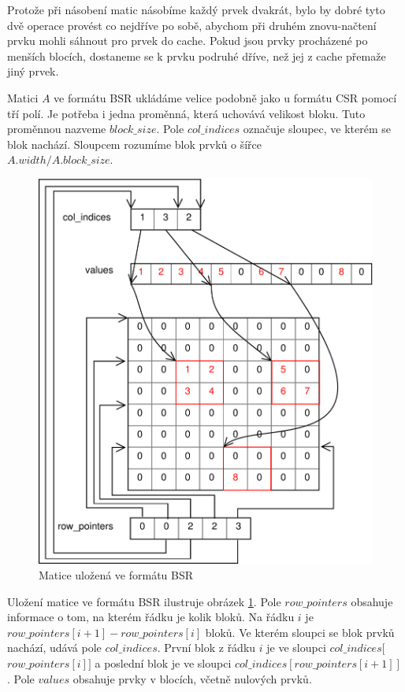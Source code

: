 Protože při násobení matic násobíme každý prvek dvakrát, bylo by dobré tyto dvě operace provést co nejdříve po sobě, abychom při druhém znovu-načtení prvku mohli sáhnout pro prvek do cache. Pokud jsou prvky procházené po menších blocích, dostaneme se k prvku podruhé dříve, než jej z cache přemaže jiný prvek.

Matici $A$ ve formátu BSR ukládáme velice podobně jako u formátu CSR pomocí tří polí. Je potřeba i jedna proměnná, která uchovává velikost bloku. Tuto proměnnou nazveme $block\_size$. Pole $col\_indices$ označuje sloupec, ve kterém se blok nachází. Sloupcem rozumíme blok prvků o šířce \\ $A.width / A.block\_size$.

\begin{figure}[htb]\centering
	\includegraphics[width=\textwidth]{./images/bsr/bsr}
	\caption{Matice uložená ve formátu BSR}
	\label{fig:BSR}
\end{figure}

Uložení matice ve formátu BSR ilustruje obrázek \ref{fig:BSR}. Pole $row\_pointers$ obsahuje informace o tom, na kterém řádku je kolik bloků. Na řádku $i$ je $row\_pointers[i+1] - row\_pointers[i]$ bloků. Ve kterém sloupci se blok prvků nachází, udává pole $col\_indices$. První blok z řádku $i$ je ve sloupci $col\_indices[$ $row\_pointers[i]]$ a poslední blok je ve sloupci $col\_indices[ row\_pointers[i+1] ]$. Pole $values$ obsahuje prvky v blocích, včetně nulových prvků.

